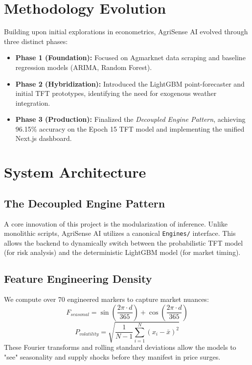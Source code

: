 \documentclass[conference]{IEEEtran}
\begin{document}
\section{Methodology Evolution}
Building upon initial explorations in econometrics, AgriSense AI evolved through three distinct phases:
\begin{itemize}[leftmargin=*]
    \item \textbf{Phase 1 (Foundation):} Focused on Agmarknet data scraping and baseline regression models (ARIMA, Random Forest).
    \item \textbf{Phase 2 (Hybridization):} Introduced the LightGBM point-forecaster and initial TFT prototypes, identifying the need for exogenous weather integration.
    \item \textbf{Phase 3 (Production):} Finalized the \textit{Decoupled Engine Pattern}, achieving 96.15\% accuracy on the Epoch 15 TFT model and implementing the unified Next.js dashboard.
\end{itemize}

\section{System Architecture}

\subsection{The Decoupled Engine Pattern}
A core innovation of this project is the modularization of inference. Unlike monolithic scripts, AgriSense AI utilizes a canonical \texttt{Engines/} interface. This allows the backend to dynamically switch between the probabilistic TFT model (for risk analysis) and the deterministic LightGBM model (for market timing).

\subsection{Feature Engineering Density}
We compute over 70 engineered markers to capture market nuances:
\begin{equation}
    F_{seasonal} = \sin\left(\frac{2\pi \cdot d}{365}\right) + \cos\left(\frac{2\pi \cdot d}{365}\right)
\end{equation}
\begin{equation}
    P_{volatility} = \sqrt{\frac{1}{N-1} \sum_{i=1}^{N} (x_i - \bar{x})^2}
\end{equation}
These Fourier transforms and rolling standard deviations allow the models to "see" seasonality and supply shocks before they manifest in price surges.
\end{document}
